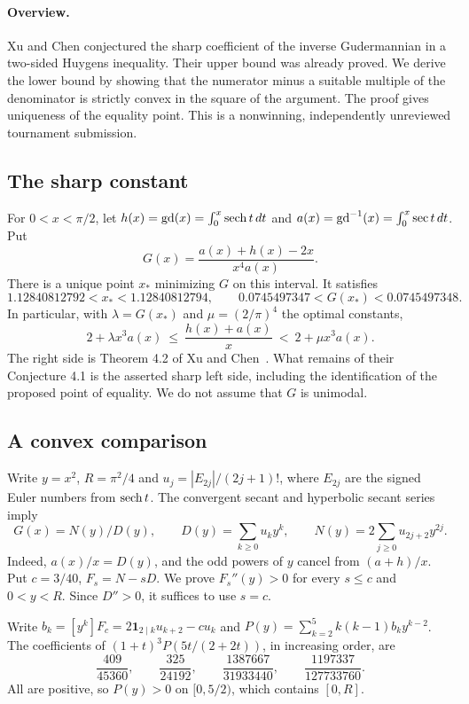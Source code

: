 \documentclass[11pt,a4paper]{article}
\begin{document}
\paragraph{Overview.}
Xu and Chen conjectured the sharp coefficient of the inverse Gudermannian in a two-sided Huygens inequality. Their upper bound was already proved. We derive the lower bound by showing that the numerator minus a suitable multiple of the denominator is strictly convex in the square of the argument. The proof gives uniqueness of the equality point. This is a nonwinning, independently unreviewed tournament submission.


\subsection*{The sharp constant}
For $0<x<\pi/2$, let $h(x)=\operatorname{gd}(x)=\int_0^x\operatorname{sech} t\,dt$ and $a(x)=\operatorname{gd}^{-1}(x)=\int_0^x\sec t\,dt$. Put
\[
 G(x)=\frac{a(x)+h(x)-2x}{x^4 a(x)} .
\]
There is a unique point $x_*$ minimizing $G$ on this interval. It satisfies
\[
 1.12840812792<x_*<1.12840812794,\qquad
 0.0745497347<G(x_*)<0.0745497348.
\]
In particular, with $\lambda=G(x_*)$ and $\mu=(2/\pi)^4$ the optimal constants,
\[
2+\lambda x^3a(x)\ \leq\ \frac{h(x)+a(x)}x\ <\ 2+\mu x^3a(x).
\]
The right side is Theorem 4.2 of Xu and Chen~\cite{R22K:xc}. What remains of their Conjecture 4.1 is the asserted sharp left side, including the identification of the proposed point of equality. We do not assume that $G$ is unimodal.

\subsection*{A convex comparison}
Write $y=x^2$, $R=\pi^2/4$ and $u_j=|E_{2j}|/(2j+1)!$, where $E_{2j}$ are the signed Euler numbers from $\operatorname{sech} t$. The convergent secant and hyperbolic secant series imply
\[
 G(x)=N(y)/D(y),\qquad
 D(y)=\sum_{k\ge0}u_k y^k,\qquad
 N(y)=2\sum_{j\ge0}u_{2j+2}y^{2j}.
\]
Indeed, $a(x)/x=D(y)$, and the odd powers of $y$ cancel from $(a+h)/x$. Put $c=3/40$, $F_s=N-sD$. We prove $F_s''(y)>0$ for every $s\le c$ and $0<y<R$. Since $D''>0$, it suffices to use $s=c$.


Write $b_k=[y^k]F_c=2\mathbf1_{2\mid k}u_{k+2}-cu_k$ and $P(y)=\sum_{k=2}^5k(k-1)b_k y^{k-2}$. The coefficients of $(1+t)^3 P(5t/(2+2t))$, in increasing order, are
\[
 \frac{409}{45360},\qquad \frac{325}{24192},\qquad
 \frac{1387667}{31933440},\qquad \frac{1197337}{127733760}.
\]
All are positive, so $P(y)>0$ on $[0,5/2)$, which contains $[0,R]$.
\end{document}
